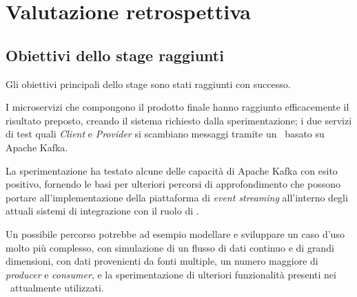 \chapter{Valutazione retrospettiva}

%
%
%
%
%
%

\section{Obiettivi dello stage raggiunti}

Gli obiettivi principali dello stage sono stati raggiunti con successo.

I microservizi che compongono il prodotto finale hanno raggiunto efficacemente il risultato preposto, creando il sistema richiesto dalla sperimentazione; i due servizi di test quali  \textit{Client} e  \textit{Provider} si scambiano messaggi tramite un \middleware\ basato su Apache Kafka.

La sperimentazione ha testato alcune delle capacità di Apache Kafka con esito positivo, fornendo le basi per ulteriori percorsi di approfondimento che possono portare all'implementazione della piattaforma di \textit{event streaming} all'interno degli attuali sistemi di integrazione con il ruolo di \middleware.

Un possibile percorso potrebbe ad esempio modellare e sviluppare un caso d'uso molto più complesso, con simulazione di un flusso di dati continuo e di grandi dimensioni, con dati provenienti da fonti multiple, un numero maggiore di \textit{producer} e \textit{consumer}, e la sperimentazione di ulteriori funzionalità presenti nei \middleware\ attualmente utilizzati.

